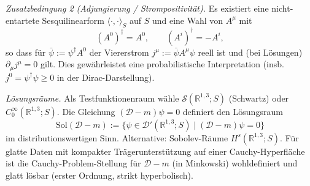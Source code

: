 \documentclass[10pt, letterpaper]{article}
\newcommand{\R}{\mathbb{R}}
\begin{document}
\emph{Zusatzbedingung 2 (Adjungierung / Strompositivität).}
Es existiert eine nicht-entartete Sesquilinearform $\langle\cdot,\cdot\rangle_S$ auf $S$ und eine Wahl von $A^\mu$ mit
\[
(A^0)^\dagger = A^0,\qquad (A^i)^\dagger = -A^i,
\]
so dass für $\bar\psi:=\psi^\dagger A^0$ der Viererstrom $j^\mu:=\bar\psi A^\mu \psi$ reell ist und (bei Lösungen) $\partial_\mu j^\mu=0$ gilt. Dies gewährleistet eine probabilistische Interpretation (insb. $j^0=\psi^\dagger\psi\ge 0$ in der Dirac-Darstellung).

\emph{Lösungsräume.}
Als Testfunktionenraum wähle $\mathcal S(\R^{1,3};S)$ (Schwartz) oder $C_0^\infty(\R^{1,3};S)$.
Die Gleichung $(\mathcal D - m)\psi=0$ definiert den Lösungsraum
\[
\mathrm{Sol}(\mathcal D - m)
:= \{\psi\in \mathcal D'(\R^{1,3};S)\mid (\mathcal D - m)\psi=0\}
\]
im distributionswertigen Sinn. Alternative: Sobolev-Räume $H^s(\R^{1,3};S)$.
Für glatte Daten mit kompakter Trägerunterstützung auf einer Cauchy-Hyperfläche ist die Cauchy-Problem-Stellung für $\mathcal D - m$ (in Minkowski) wohldefiniert und glatt lösbar (erster Ordnung, strikt hyperbolisch).
\end{document}
